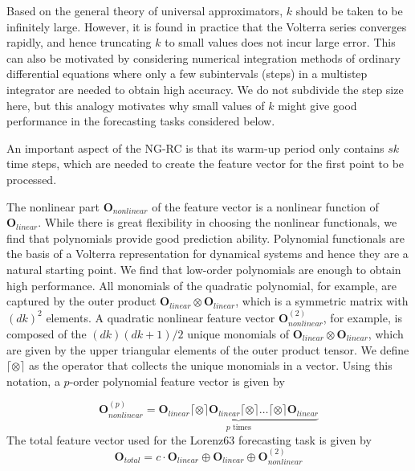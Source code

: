 \documentclass[11pt, oneside]{article}
\begin{document}
Based on the general theory of universal approximators, \(k\) should be taken to be infinitely large. However, it is found in practice that the Volterra series converges rapidly, and hence truncating \(k\) to small values does not incur large error. This can also be motivated by considering numerical integration methods of ordinary differential equations where only a few subintervals (steps) in a multistep integrator are needed to obtain high accuracy. We do not subdivide the step size here, but this analogy motivates why small values of \(k\) might give good performance in the forecasting tasks considered below.

An important aspect of the NG-RC is that its warm-up period only contains \(sk\) time steps, which are needed to create the feature vector for the first point to be processed.

The nonlinear part \(\mathbf{O}_{nonlinear}\) of the feature vector is a nonlinear function of \(\mathbf{O}_{linear}\). While there is great flexibility in choosing the nonlinear functionals, we find that polynomials provide good prediction ability. Polynomial functionals are the basis of a Volterra representation for dynamical systems and hence they are a natural starting point. We find that low-order polynomials are enough to obtain high performance.
All monomials of the quadratic polynomial, for example, are captured by the outer product \(\mathbf{O}_{linear} \otimes \mathbf{O}_{linear}\), which is a symmetric
matrix with \((dk)^2\) elements. A quadratic nonlinear feature vector \(\mathbf{O}^{(2)}_{nonlinear}\), for example, is composed of the \((dk)(dk+1)/2\) unique monomials of \(\mathbf{O}_{linear} \otimes \mathbf{O}_{linear}\), which are given by the upper triangular elements of the outer product tensor. We define \(\lceil \otimes \rceil\) as the operator that collects the unique monomials in a vector. Using this notation, a \(p\)-order polynomial feature vector is given by

\begin{equation}
    \mathbf{O}^{(p)}_{nonlinear} =  \underbrace{\mathbf{O}_{linear} \lceil \otimes \rceil \mathbf{O}_{linear} \lceil \otimes \rceil \ldots \lceil \otimes \rceil \mathbf{O}_{linear} }_{p \text{ times}}
\end{equation}
The total feature vector used for the Lorenz63 forecasting task is given by
\begin{equation}
    \mathbf{O}_{total} = c \cdot \mathbf{O}_{linear} \oplus \mathbf{O}_{linear}  \oplus  \mathbf{O}^{(2)}_{nonlinear}
\end{equation}
\end{document}
